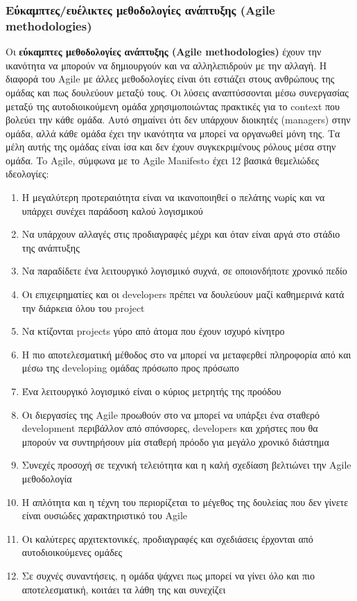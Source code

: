 \subsubsection{Εύκαμπτες/ευέλικτες μεθοδολογίες ανάπτυξης (Agile methodologies)}

Οι \textbf{εύκαμπτες μεθοδολογίες ανάπτυξης (Agile methodologies)} έχουν την ικανότητα να μπορούν να δημιουργούν και να αλληλεπιδρούν με την αλλαγή. 
Η διαφορά του Agile με άλλες μεθοδολογίες είναι ότι εστιάζει στους ανθρώπους της ομάδας και πως δουλεύουν μεταξύ τους. 
Οι λύσεις αναπτύσσονται μέσω συνεργασίας μεταξύ της αυτοδιοικούμενη ομάδα χρησιμοποιώντας πρακτικές για το context που βολεύει την κάθε ομάδα. 
Αυτό σημαίνει ότι δεν υπάρχουν διοικητές (managers) στην ομάδα, αλλά κάθε ομάδα έχει την ικανότητα να μπορεί να οργανωθεί μόνη της. 
Τα μέλη αυτής της ομάδας είναι ίσα και δεν έχουν συγκεκριμένους ρόλους μέσα στην ομάδα. 
To Agile, σύμφωνα με το Agile Manifesto έχει 12 βασικά θεμελιώδες ιδεολογίες:

\begin{enumerate}
    \item Η μεγαλύτερη προτεραιότητα είναι να ικανοποιηθεί ο πελάτης νωρίς και να υπάρχει συνέχει παράδοση καλού λογισμικού
    \item Να υπάρχουν αλλαγές στις προδιαγραφές μέχρι και όταν είναι αργά στο στάδιο της ανάπτυξης
    \item Να παραδίδετε ένα λειτουργικό λογισμικό συχνά, σε οποιονδήποτε χρονικό πεδίο
    \item Οι επιχειρηματίες και οι developers πρέπει να δουλεύουν μαζί καθημερινά κατά την διάρκεια όλου του project
    \item Να κτίζονται projects γύρο από άτομα που έχουν ισχυρό κίνητρο
    \item Η πιο αποτελεσματική μέθοδος στο να μπορεί να μεταφερθεί πληροφορία από και μέσω της developing ομάδας πρόσωπο προς πρόσωπο
    \item Ένα λειτουργικό λογισμικό είναι ο κύριος μετρητής της προόδου
    \item Οι διεργασίες της Agile προωθούν στο να μπορεί να υπάρξει ένα σταθερό development περιβάλλον από σπόνσορες, developers και χρήστες που θα μπορούν να συντηρήσουν μία σταθερή πρόοδο για μεγάλο χρονικό διάστημα
    \item Συνεχές προσοχή σε τεχνική τελειότητα και η καλή σχεδίαση βελτιώνει την Agile μεθοδολογία
    \item Η απλότητα και η τέχνη του περιορίζεται το μέγεθος της δουλείας που δεν γίνετε είναι ουσιώδες χαρακτηριστικό του Agile
    \item Οι καλύτερες αρχιτεκτονικές, προδιαγραφές και σχεδιάσεις έρχονται από αυτοδιοικούμενες ομάδες
    \item Σε συχνές συναντήσεις, η ομάδα ψάχνει πως μπορεί να γίνει όλο και πιο αποτελεσματική, κοιτάει τα λάθη της και συνεχίζει
\end{enumerate}

